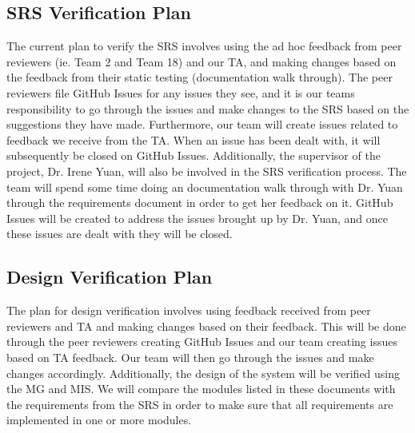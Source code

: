 \documentclass[12pt, titlepage]{article}
\begin{document}
\subsection{SRS Verification Plan} \label{SRSVerification}


The current plan to verify the SRS involves using the ad hoc feedback from peer reviewers (ie. Team 2 and Team 18) and our TA, and making changes based on
the feedback from their static testing (documentation walk through). The peer reviewers file GitHub Issues for any issues they see, and it is our teams responsibility to go through the issues and make changes to the SRS based on the suggestions they have made. Furthermore, our team will create issues related to feedback we receive from the TA. When an issue has been dealt with, it will subsequently be closed on GitHub Issues. Additionally, the supervisor of the project, Dr. Irene Yuan, will also be involved in the SRS verification process. The team will spend some time doing an documentation walk through with Dr. Yuan through the requirements document in order to get her feedback on it. GitHub Issues will be created to address the issues brought up by Dr. Yuan, and once these issues are dealt with they will be closed.

\subsection{Design Verification Plan}



The plan for design verification involves using feedback received from peer reviewers and TA and making changes based on their feedback. This will be done through the peer reviewers creating GitHub Issues and our team creating issues based on TA feedback. Our team will then go through the issues and make changes accordingly. Additionally, the design of the system will be verified using the MG and MIS. We will compare the modules listed in these documents with the requirements from the SRS in order to make sure that all requirements are implemented in one or more modules. 
\end{document}
